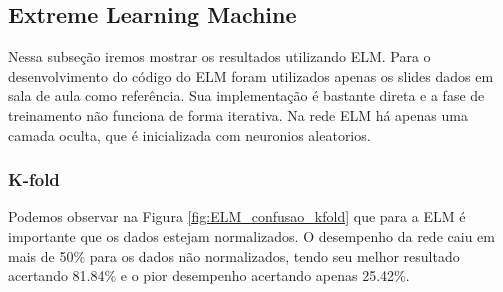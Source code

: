 \documentclass[paper=a4, fontsize=11pt]{scrartcl}
\numberwithin{equation}{section}		%
\numberwithin{figure}{section}			%
\numberwithin{table}{section}				%
\begin{document}
	\subsection{\textbf{Extreme Learning Machine}}
	
	Nessa subseção iremos mostrar os resultados utilizando ELM. Para o desenvolvimento do código do ELM foram utilizados apenas os slides dados em sala de aula como referência. Sua implementação é bastante direta e a fase de treinamento não funciona de forma iterativa. Na rede ELM há apenas uma camada oculta, que é inicializada com neuronios aleatorios.
    
    \subsubsection{K-fold}
    
	Podemos observar na Figura \ref{fig:ELM_confusao_kfold} que para a ELM é importante que os dados estejam normalizados. O desempenho da rede caiu em mais de 50\% para os dados não normalizados, tendo seu melhor resultado acertando 81.84\% e o pior desempenho acertando apenas 25.42\%.
    
\end{document}
